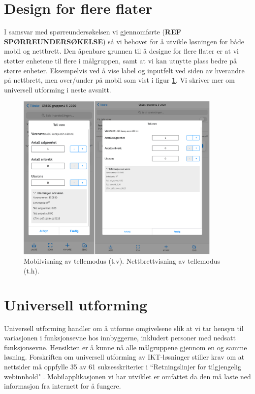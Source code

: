 \section{\textbf{Design for flere flater}}
I samsvar med spørreundersøkelsen vi gjennomførte (\textbf{REF SPØRREUNDERSØKELSE}) så vi behovet for å utvikle løsningen for både mobil og nettbrett. Den åpenbare grunnen til å designe for flere flater er at vi støtter enhetene til flere i målgruppen, samt at vi kan utnytte plass bedre på større enheter. Eksempelvis ved å vise label og inputfelt ved siden av hverandre på nettbrett, men over/under på mobil som vist i figur \textbf{\ref{fig:tablet_vs_mobil}}. Vi skriver mer om universell utforming i neste avsnitt.

\begin{figure}[H] 
    \centering
    \includegraphics[width=100mm]{figures/Design-utforming/Tablet_vs_mobil.jpg}
    \caption{Mobilvisning av tellemodus (t.v). Nettbrettvisning av tellemodus (t.h).}
    \label{fig:tablet_vs_mobil}
\end{figure}

\section{\textbf{Universell utforming}} \label{Universell_utforming}
Universell utforming handler om å utforme omgivelsene slik at vi tar hensyn til variasjonen i funksjonsevne hos innbyggerne, inkludert personer med nedsatt funksjonsevne.\cite{digiuniversell} Hensikten er å kunne nå alle målgruppene gjennom en og samme løsning. Forskriften om universell utforming av IKT-løsninger stiller krav om at nettsider må oppfylle 35 av 61 suksesskriterier i “Retningslinjer for tilgjengelig webinnhold" \cite{digiwcag}. Mobilapplikasjonen vi har utviklet er omfattet da den må laste ned informasjon fra internett for å fungere.

